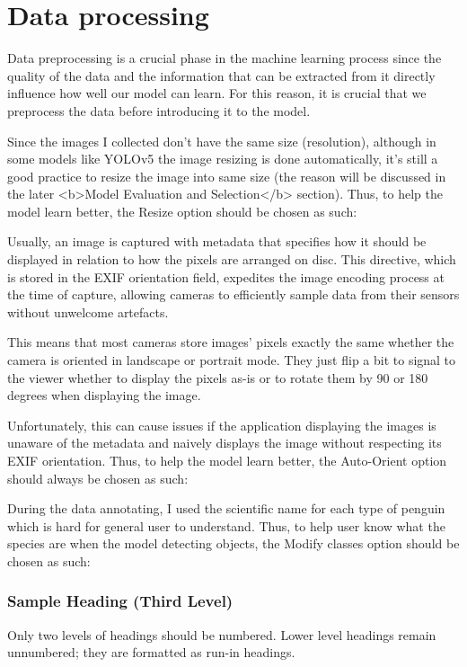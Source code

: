 \documentclass[runningheads]{llncs}
\begin{document}
\section{Data processing}
Data preprocessing is a crucial phase in the machine learning process since the quality of the data and the information that can be extracted from it directly influence how well our model can learn. For this reason, it is crucial that we preprocess the data before introducing it to the model.

Since the images I collected don't have the same size (resolution), although in some models like YOLOv5 the image resizing is done automatically, it's still a good practice to resize the image into same size (the reason will be discussed in the later <b>Model Evaluation and Selection</b> section). Thus, to help the model learn better, the Resize option should be chosen as such: 

Usually, an image is captured with metadata that specifies how it should be displayed in relation to how the pixels are arranged on disc. This directive, which is stored in the EXIF orientation field, expedites the image encoding process at the time of capture, allowing cameras to efficiently sample data from their sensors without unwelcome artefacts.

This means that most cameras store images' pixels exactly the same whether the camera is oriented in landscape or portrait mode. They just flip a bit to signal to the viewer whether to display the pixels as-is or to rotate them by 90 or 180 degrees when displaying the image.

Unfortunately, this can cause issues if the application displaying the images is unaware of the metadata and naively displays the image without respecting its EXIF orientation. Thus, to help the model learn better, the Auto-Orient option should always be chosen as such: 

During the data annotating, I used the scientific name for each type of penguin which is hard for general user to understand. Thus, to help user know what the species are when the model detecting objects, the Modify classes option should be chosen as such:

\subsubsection{Sample Heading (Third Level)} Only two levels of
headings should be numbered. Lower level headings remain unnumbered;
they are formatted as run-in headings.
\end{document}
